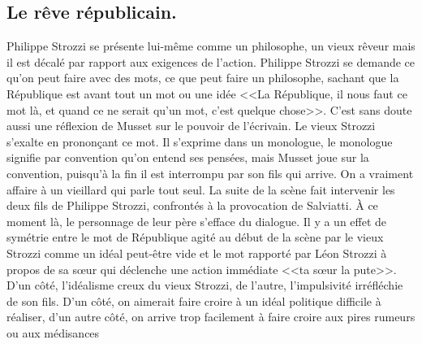 \documentclass[12pt]{article}
\begin{document}
\subsection*{Le rêve républicain.}
Philippe Strozzi se présente lui-même comme un philosophe, un vieux rêveur mais il est décalé par rapport aux exigences de l'action.
Philippe Strozzi se demande ce qu'on peut faire avec des mots, ce que peut faire un philosophe, sachant que la République est avant tout un mot ou une idée <<La République, il nous faut ce mot là, et quand ce ne serait qu'un mot, c'est quelque chose>>.
C'est sans doute aussi une réflexion de Musset sur le pouvoir de l'écrivain.
Le vieux Strozzi s'exalte en prononçant ce mot.
Il s'exprime dans un monologue, le monologue signifie par convention qu'on entend ses pensées, mais Musset joue sur la convention, puisqu'à la fin il est interrompu par son fils qui arrive.
On a vraiment affaire à un vieillard qui parle tout seul. 
La suite de la scène fait intervenir les deux fils de Philippe Strozzi, confrontés à la provocation de Salviatti. À ce moment là, le personnage de leur père s'efface du dialogue.
Il y a un effet de symétrie entre le mot de République agité au début de la scène par le vieux Strozzi comme un idéal peut-être vide et le mot rapporté par Léon Strozzi à propos de sa sœur qui déclenche une action immédiate <<ta sœur la pute>>. D'un côté, l'idéalisme creux du vieux Strozzi, de l'autre, l'impulsivité irréfléchie de son fils.
D'un côté, on aimerait faire croire à un idéal politique difficile à réaliser, d'un autre côté, on arrive trop facilement à faire croire aux pires rumeurs ou aux médisances
\end{document}

